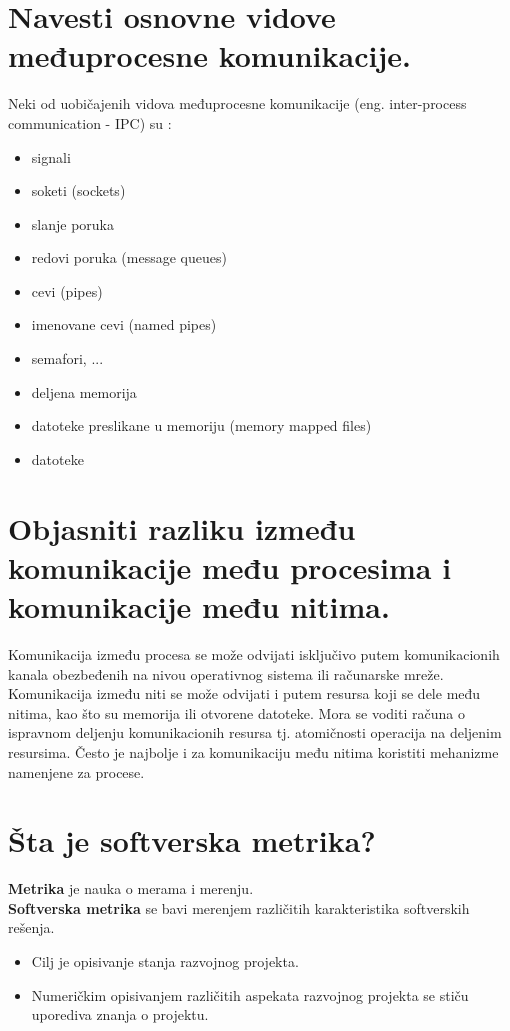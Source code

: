 \documentclass[a4paper]{article}
\begin{document}
\section{Navesti osnovne vidove međuprocesne komunikacije.}
  Neki od uobičajenih vidova međuprocesne komunikacije (eng. inter-process communication - IPC) su :
  \begin{itemize}
    \item signali
    \item soketi (sockets)
    \item slanje poruka
    \item redovi poruka (message queues)
    \item cevi (pipes)
    \item imenovane cevi (named pipes)
    \item semafori, ...
    \item deljena memorija
    \item datoteke preslikane u memoriju (memory mapped files)
    \item datoteke
  \end{itemize}

\section{Objasniti razliku između komunikacije među procesima i komunikacije među nitima.}
  Komunikacija između procesa se može odvijati isključivo putem komunikacionih kanala obezbeđenih 
  na nivou operativnog sistema ili računarske mreže.
  Komunikacija između niti se može odvijati i putem resursa koji se dele među nitima, 
  kao što su memorija ili otvorene datoteke. Mora se voditi računa o ispravnom deljenju 
  komunikacionih resursa tj. atomičnosti operacija na deljenim resursima. 
  Često je najbolje i za komunikaciju među nitima koristiti mehanizme namenjene za procese.
  
\section{Šta je softverska metrika?}
  \textbf{Metrika} je nauka o merama i merenju.\\

  \textbf{Softverska metrika} se bavi merenjem različitih karakteristika softverskih rešenja. \\
  \begin{itemize}
    \item Cilj je opisivanje stanja razvojnog projekta. 
    \item Numeričkim opisivanjem različitih aspekata razvojnog 
          projekta se stiču uporediva znanja o projektu.
  \end{itemize}
  
\end{document}
